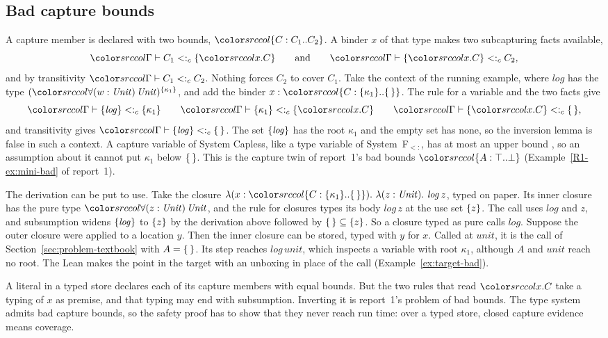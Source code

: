 \subsection{Bad capture bounds}\label{sec:problem-bad}

A capture member is declared with two bounds, $\dcap{C}{C_1}{C_2}$. A binder $x$ of that type makes two subcapturing facts available,
\[
\subcj{\Gamma}{C_1}{\cset{\dsel{x}{C}}} \qquad\text{and}\qquad \subcj{\Gamma}{\cset{\dsel{x}{C}}}{C_2} ,
\]
and by transitivity $\subcj{\Gamma}{C_1}{C_2}$. Nothing forces $C_2$ to cover $C_1$. Take the context of the running example, where $\mathit{log}$ has the type $\capt{(\dall{w}{\Unit}{\Unit})}{\cset{\kappa_1}}$, and add the binder $x : \dcap{C}{\cset{\kappa_1}}{\cempty}$. The rule for a variable and the two facts give
\[
\subcj{\Gamma}{\cset{\mathit{log}}}{\cset{\kappa_1}} \qquad \subcj{\Gamma}{\cset{\kappa_1}}{\cset{\dsel{x}{C}}} \qquad \subcj{\Gamma}{\cset{\dsel{x}{C}}}{\cempty} ,
\]
and transitivity gives $\subcj{\Gamma}{\cset{\mathit{log}}}{\cempty}$. The set $\{\mathit{log}\}$ has the root $\kappa_1$ and the empty set has none, so the inversion lemma is false in such a context. A capture variable of System Capless, like a type variable of System~F$_{<:}$, has at most an upper bound \cite{xu2025box}, so an assumption about it cannot put $\kappa_1$ below $\{\,\}$. This is the capture twin of report~1's bad bounds $\dtyp{A}{\top}{\bot}$ (Example~\ref{R1-ex:mini-bad} of report~1).

The derivation can be put to use. Take the closure $\lambda(x : \dcap{C}{\cset{\kappa_1}}{\cempty}).\ \lambda(z : \Unit).\ \mathit{log}\,z$, typed on paper. Its inner closure has the pure type $\dall{z}{\Unit}{\Unit}$, and the rule for closures types its body $\mathit{log}\,z$ at the use set $\{z\}$. The call uses $\mathit{log}$ and $z$, and subsumption widens $\{\mathit{log}\}$ to $\{z\}$ by the derivation above followed by $\{\,\} \subseteq \{z\}$. So a closure typed as pure calls $\mathit{log}$. Suppose the outer closure were applied to a location $y$. Then the inner closure can be stored, typed with $y$ for $x$. Called at $\mathit{unit}$, it is the call of Section~\ref{sec:problem-textbook} with $A = \{\,\}$. Its step reaches $\mathit{log}\,\mathit{unit}$, which inspects a variable with root $\kappa_1$, although $A$ and $\mathit{unit}$ reach no root. The Lean makes the point in the target with an unboxing in place of the call (Example~\ref{ex:target-bad}).

A literal in a typed store declares each of its capture members with equal bounds. But the two rules that read $\dsel{x}{C}$ take a typing of $x$ as premise, and that typing may end with subsumption. Inverting it is report~1's problem of bad bounds. The type system admits bad capture bounds, so the safety proof has to show that they never reach run time: over a typed store, closed capture evidence means coverage.

